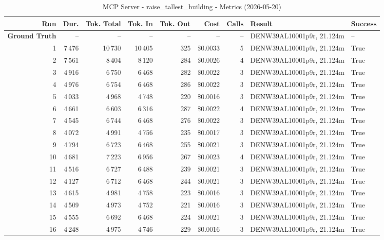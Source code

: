 \documentclass[a4paper,11pt]{article}
\begin{document}
\begin{table}[ht]
\centering
\scriptsize
\caption{MCP Server - raise\_tallest\_building - Metrics (2026-05-20)}
\label{tab:mcp\_raise\_tallest\_building\_metrics\_2026-05-20}
\begin{tabular}{r r r r r r r p{3cm} l}
\hline
Run & Dur. & Tok. Total & Tok. In & Tok. Out & Cost & Calls & Result & Success \\
\hline
\textbf{Ground Truth} & -- & -- & -- & -- & -- & -- & DENW39AL10001p9r, 21.124m & -- \\
\hline
1 & 7\,476 & 10\,730 & 10\,405 & 325 & \$0.0033 & 5 & DENW39AL10001p9r, 21.124m & True \\
2 & 7\,561 & 8\,404 & 8\,120 & 284 & \$0.0026 & 4 & DENW39AL10001p9r, 21.124m & True \\
3 & 4\,916 & 6\,750 & 6\,468 & 282 & \$0.0022 & 3 & DENW39AL10001p9r, 21.124m & True \\
4 & 4\,976 & 6\,754 & 6\,468 & 286 & \$0.0022 & 3 & DENW39AL10001p9r, 21.124m & True \\
5 & 4\,033 & 4\,968 & 4\,748 & 220 & \$0.0016 & 3 & DENW39AL10001p9r, 21.124m & True \\
6 & 4\,661 & 6\,603 & 6\,316 & 287 & \$0.0022 & 4 & DENW39AL10001p9r, 21.124m & True \\
7 & 4\,545 & 6\,744 & 6\,468 & 276 & \$0.0022 & 3 & DENW39AL10001p9r, 21.124m & True \\
8 & 4\,072 & 4\,991 & 4\,756 & 235 & \$0.0017 & 3 & DENW39AL10001p9r, 21.124m & True \\
9 & 4\,794 & 6\,723 & 6\,468 & 255 & \$0.0021 & 3 & DENW39AL10001p9r, 21.124m & True \\
10 & 4\,681 & 7\,223 & 6\,956 & 267 & \$0.0023 & 4 & DENW39AL10001p9r, 21.124m & True \\
11 & 4\,516 & 6\,727 & 6\,488 & 239 & \$0.0021 & 3 & DENW39AL10001p9r, 21.124m & True \\
12 & 4\,127 & 6\,712 & 6\,468 & 244 & \$0.0021 & 3 & DENW39AL10001p9r, 21.124m & True \\
13 & 4\,615 & 4\,981 & 4\,758 & 223 & \$0.0016 & 3 & DENW39AL10001p9r, 21.124m & True \\
14 & 4\,509 & 4\,973 & 4\,752 & 221 & \$0.0016 & 3 & DENW39AL10001p9r, 21.124m & True \\
15 & 4\,555 & 6\,692 & 6\,468 & 224 & \$0.0021 & 3 & DENW39AL10001p9r, 21.124m & True \\
16 & 4\,248 & 4\,975 & 4\,746 & 229 & \$0.0016 & 3 & DENW39AL10001p9r, 21.124m & True \\

\end{tabular}
\end{table}
\end{document}
